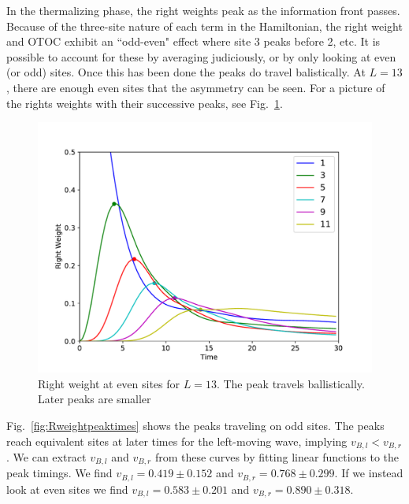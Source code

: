 \documentclass[aps,prx,reprint,superscriptaddress, longbibliography]{revtex4-1}
\newcommand{\charlie}[1]{{\color{Magenta}{{#1}}}}
\begin{document}
In the thermalizing phase, the right weights peak as the information front passes. Because of the three-site nature of each term in the Hamiltonian, the right weight and OTOC exhibit an ``odd-even" effect where site 3 peaks before 2, etc. It is possible to account for these by averaging judiciously, or by only looking at even (or odd) sites. Once this has been done the peaks do travel balistically. At $L=13$, there are enough even sites that the asymmetry can be seen. For a picture of the rights weights with their successive peaks, see Fig.~\ref{fig:Rweightpeakshape}. 

\begin{figure}
	\includegraphics[width=\columnwidth]{Rweightpeakshape}
	\caption{Right weight at even sites for $L=13$. The peak travels ballistically. Later peaks are smaller \charlie{Is this due to broadening?}}
	\label{fig:Rweightpeakshape}
\end{figure}

Fig.~\ref{fig:Rweightpeaktimes} shows the peaks traveling on odd sites. The peaks reach equivalent sites at later times for the left-moving wave, implying $v_{B,l}<v_{B,r}$. We can extract $v_{B,l}$ and $v_{B,r}$ from these curves by fitting linear functions to the peak timings. We find $v_{B,l}=0.419\pm 0.152$ and $v_{B,r}=0.768\pm0.299$. If we instead look at even sites we find $v_{B,l}=0.583\pm 0.201$ and $v_{B,r}=0.890\pm0.318$.
\end{document}
